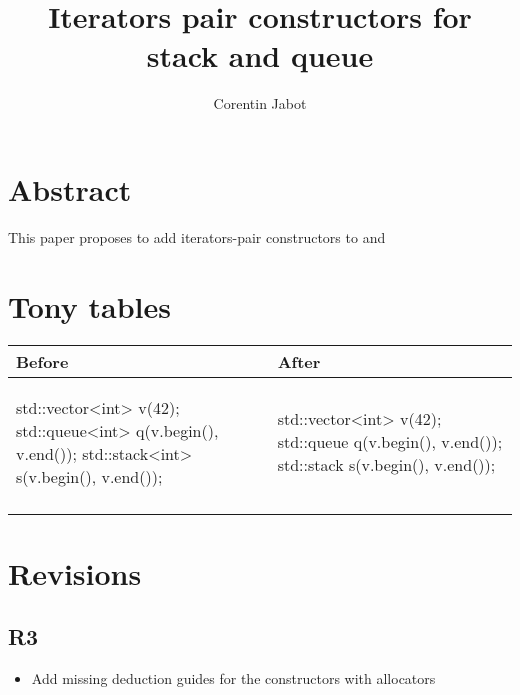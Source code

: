 \documentclass{wg21}
\title{Iterators pair constructors for stack and queue}
\author{Corentin Jabot}{corentin.jabot@gmail.com}
\begin{document}
\maketitle

\section{Abstract}

This paper proposes to add iterators-pair constructors to  and 

\section{Tony tables}
\begin{center}
\begin{tabular}{l|l}
Before & After\\ \hline

\begin{minipage}[t]{0.5\textwidth}
\begin{colorblock}
std::vector<int> v(42);
std::queue<int> q({v.begin(), v.end()});
std::stack<int> s({v.begin(), v.end()});
\end{colorblock}
\end{minipage}
&
\begin{minipage}[t]{0.3\textwidth}
\begin{colorblock}
std::vector<int> v(42);
std::queue q(v.begin(), v.end());
std::stack s(v.begin(), v.end());
\end{colorblock}
\end{minipage}
\\\\ \hline

\end{tabular}
\end{center}

\section{Revisions}

\subsection{R3}
\begin{itemize}
    \item Add missing deduction guides for the constructors with allocators
\end{itemize}
\end{document}
